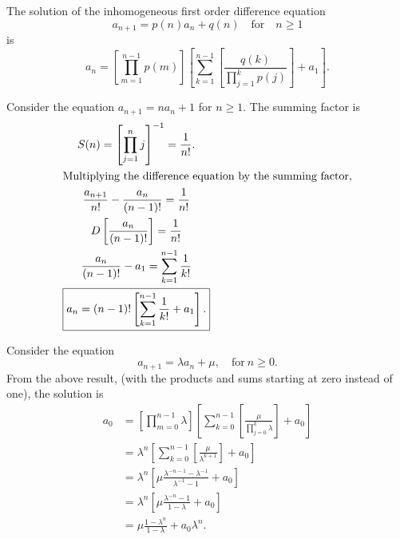 \begin{Result}
  The solution of the inhomogeneous first order difference equation
  \[a_{n+1} = p(n) a_n + q(n) \quad \mathrm{for} \quad n \geq 1 \]
  is 
  \[ a_n = \left[ \prod_{m=1}^{n-1} p(m) \right]
  \left[ \sum_{k=1}^{n-1} \left[ \frac{q(k)}{\prod_{j=1}^{k} p(j)} 
    \right] + a_1  \right].   \]
\end{Result}








\begin{Example} 
  Consider the equation $a_{n+1} = n a_n + 1$ for $n \geq 1$.
  The summing factor is
  \begin{gather*}
    S(n) = \left[ \prod_{j=1}^n j \right]^{-1} = \frac{1}{n!}. \\
    \intertext{Multiplying the difference equation by the summing factor,}
    \frac{a_{n+1}}{n!} - \frac{a_n}{(n-1)!} = \frac{1}{n!} \\
    D\left[ \frac{a_n}{(n-1)!} \right] = \frac{1}{n!} \\
    \frac{a_n}{(n-1)!} - a_1 = \sum_{k=1}^{n-1} \frac{1}{k!} \\
    \boxed{ a_n = (n-1)! \left[ \sum_{k=1}^{n-1} \frac{1}{k!} 
        + a_1 \right].} 
  \end{gather*}
\end{Example}





\begin{Example}
  Consider the equation
  \[
  a_{n+1} = \lambda a_n + \mu, \quad \mathrm{for}\ n \geq 0.
  \]
  From the above result, (with the products and sums starting at zero instead
  of one), the solution is
  \begin{align*}
    a_0     &= \left[ \prod_{m=0}^{n-1} \lambda \right] 
    \left[ \sum_{k=0}^{n-1} \left[ \frac{\mu}
        {\prod_{j=0}^k \lambda} \right] + a_0 \right] \\
    &= \lambda^n \left[ \sum_{k=0}^{n-1} \left[ \frac{\mu}
        {\lambda^{k+1}} \right] + a_0 \right] \\
    &= \lambda^n \left[ \mu \frac{\lambda^{-n-1}-\lambda^{-1}}
      {\lambda^{-1} - 1} + a_0 \right] \\
    &= \lambda^n \left[ \mu \frac{\lambda^{-n}-1}
      {1 - \lambda} + a_0 \right] \\
    &= \mu \frac{1 - \lambda^n} {1 - \lambda} + a_0 \lambda^n. 
  \end{align*}
\end{Example}







